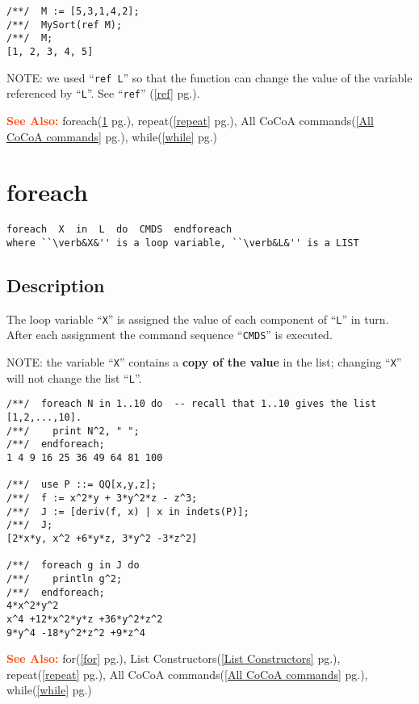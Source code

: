 \documentclass[a4paper]{mybook}
\newenvironment{command}{}{} %
\newcommand\SeeAlso{\par\textcolor{OrangeRed}{\textbf{\large See Also: }}}
\begin{document}
\begin{command}
\begin{Verbatim}[label=example, rulecolor=\color{PineGreen}, frame=single]
/**/  M := [5,3,1,4,2];
/**/  MySort(ref M);
/**/  M;
[1, 2, 3, 4, 5]
\end{Verbatim}

NOTE: we used ``\verb&ref L&'' so that the function can change the value
of the variable referenced by ``\verb&L&''.  See ``\verb&ref&'' (\ref{ref} pg.\pageref{ref}).

\SeeAlso %
  foreach(\ref{foreach} pg.\pageref{foreach}), 
    repeat(\ref{repeat} pg.\pageref{repeat}), 
    All CoCoA commands(\ref{All CoCoA commands} pg.\pageref{All CoCoA commands}), 
    while(\ref{while} pg.\pageref{while})
\end{command} %

\section{foreach}
\label{foreach}
\begin{command} %


\begin{Verbatim}[label=syntax, rulecolor=\color{MidnightBlue},
frame=single]
foreach  X  in  L  do  CMDS  endforeach
where ``\verb&X&'' is a loop variable, ``\verb&L&'' is a LIST
\end{Verbatim}


\subsection*{Description}

The loop variable ``\verb&X&'' is assigned the value of each component
of ``\verb&L&'' in turn.  After each assignment the command sequence
``\verb&CMDS&'' is executed.
\par 
NOTE: the variable ``\verb&X&'' contains a \textbf{copy of the value} in the list;
changing ``\verb&X&'' will not change the list ``\verb&L&''.
\begin{Verbatim}[label=example, rulecolor=\color{PineGreen}, frame=single]
/**/  foreach N in 1..10 do  -- recall that 1..10 gives the list [1,2,...,10].
/**/    print N^2, " ";
/**/  endforeach;
1 4 9 16 25 36 49 64 81 100

/**/  use P ::= QQ[x,y,z];
/**/  f := x^2*y + 3*y^2*z - z^3;
/**/  J := [deriv(f, x) | x in indets(P)];
/**/  J;
[2*x*y, x^2 +6*y*z, 3*y^2 -3*z^2]

/**/  foreach g in J do
/**/    println g^2;
/**/  endforeach;
4*x^2*y^2
x^4 +12*x^2*y*z +36*y^2*z^2
9*y^4 -18*y^2*z^2 +9*z^4
\end{Verbatim}


\SeeAlso %
  for(\ref{for} pg.\pageref{for}), 
    List Constructors(\ref{List Constructors} pg.\pageref{List Constructors}), 
    repeat(\ref{repeat} pg.\pageref{repeat}), 
    All CoCoA commands(\ref{All CoCoA commands} pg.\pageref{All CoCoA commands}), 
    while(\ref{while} pg.\pageref{while})
\end{command} %
\end{document}

